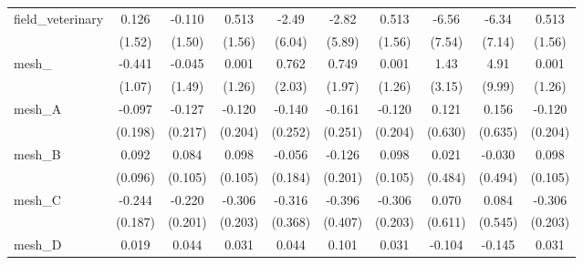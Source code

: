 \begin{tabular}{lccccccccc}
   field\_veterinary                                           & 0.126          & -0.110         & 0.513         & -2.49          & -2.82          & 0.513         & -6.56        & -6.34       & 0.513\\   
                                                               & (1.52)         & (1.50)         & (1.56)        & (6.04)         & (5.89)         & (1.56)        & (7.54)       & (7.14)      & (1.56)\\   
   mesh\_                                                      & -0.441         & -0.045         & 0.001         & 0.762          & 0.749          & 0.001         & 1.43         & 4.91        & 0.001\\   
                                                               & (1.07)         & (1.49)         & (1.26)        & (2.03)         & (1.97)         & (1.26)        & (3.15)       & (9.99)      & (1.26)\\   
   mesh\_A                                                     & -0.097         & -0.127         & -0.120        & -0.140         & -0.161         & -0.120        & 0.121        & 0.156       & -0.120\\   
                                                               & (0.198)        & (0.217)        & (0.204)       & (0.252)        & (0.251)        & (0.204)       & (0.630)      & (0.635)     & (0.204)\\   
   mesh\_B                                                     & 0.092          & 0.084          & 0.098         & -0.056         & -0.126         & 0.098         & 0.021        & -0.030      & 0.098\\   
                                                               & (0.096)        & (0.105)        & (0.105)       & (0.184)        & (0.201)        & (0.105)       & (0.484)      & (0.494)     & (0.105)\\   
   mesh\_C                                                     & -0.244         & -0.220         & -0.306        & -0.316         & -0.396         & -0.306        & 0.070        & 0.084       & -0.306\\   
                                                               & (0.187)        & (0.201)        & (0.203)       & (0.368)        & (0.407)        & (0.203)       & (0.611)      & (0.545)     & (0.203)\\   
   mesh\_D                                                     & 0.019          & 0.044          & 0.031         & 0.044          & 0.101          & 0.031         & -0.104       & -0.145      & 0.031\\   

\end{tabular}
